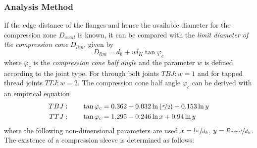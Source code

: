 \subsubsection{Analysis Method}
If the edge distance of the flanges and hence the available diameter for the compression zone $D_{avail}$
is known, it can be compared with the \emph{limit diameter of the compression cone} $D_{lim}$, given by
\begin{equation}
  D_{lim} = d_h + w l_K \tan \varphi_c
\end{equation}
where $\varphi_c$ is the \emph{compression cone half angle} and the parameter $w$ is defined according
to the joint type. For through bolt joints $TBJ: w=1$ and for tapped thread joints $TTJ: w=2$. 
The compression cone half angle $\varphi_c$ can be derived with an empirical equation \cite{ECSS_HB_32_23A}
\begin{subequations}
  \begin{align}
    TBJ: \qquad \tan \varphi_c &= 0.362+0.032\ln\left(\nicefrac{x}{2}\right)+0.153\ln y \\
    TTJ: \qquad \tan \varphi_c &= 1.295-0.246\ln x +0.94\ln y
  \end{align}
\end{subequations}
where the following non-dimensional parameters are used $x=\nicefrac{l_K}{d_h}$, 
$y=\nicefrac{D_{avail}}{d_h}$. The existence of a compression sleeve is determined as follows:
